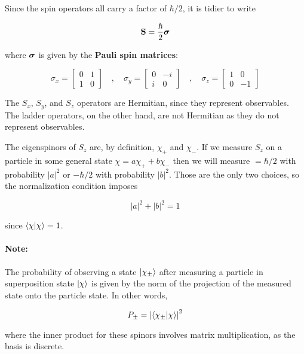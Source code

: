 \documentclass[12pt, titlepage]{article}
\begin{document}
Since the spin operators all carry a factor of $\hbar/2$, it is tidier to write

\begin{equation}
	\vb{S} = \frac{\hbar}{2}\vb*{\sigma}
\end{equation}

where $\vb*{\sigma}$ is given by the \textbf{Pauli spin matrices}:

\begin{equation}
\boxed{
	\sigma_x = \begin{bmatrix} 0 & 1 \\ 1 & 0\end{bmatrix} \quad,\quad
	\sigma_y = \begin{bmatrix} 0 & -i \\ i & 0\end{bmatrix} \quad,\quad
	\sigma_z = \begin{bmatrix} 1 & 0 \\ 0 & -1\end{bmatrix} }
\end{equation}

The $S_x$, $S_y$, and $S_z$ operators are Hermitian, since they represent observables. The ladder operators, on the other hand, are not Hermitian as they do not represent observables. 

The eigenspinors of $S_z$ are, by definition, $\chi_+$ and $\chi_-$. If we measure $S_z$ on a particle in some general state $\chi = a\chi_+ + b\chi_-$ then we will measure $=\hbar/2$ with probability $|a|^2$ or $-\hbar/2$ with probability $|b|^2$. Those are the only two choices, so the normalization condition imposes

\begin{equation}
	|a|^2 + |b|^2 = 1
\end{equation}

since $\bra{\chi}\ket{\chi} = 1$. 

\begin{mdframed}
\paragraph*{Note:} The probability of observing a state $\ket{\chi_\pm}$ after measuring a particle in superposition state $\ket{\chi}$ is given by the norm of the projection of the measured state onto the particle state. In other words,

\begin{equation}
	P_\pm = \qty|\bra{\chi_\pm}\ket{\chi}|^2
\end{equation}

where the inner product for these spinors involves matrix multiplication, as the basis is discrete.
\end{mdframed}
\end{document}
